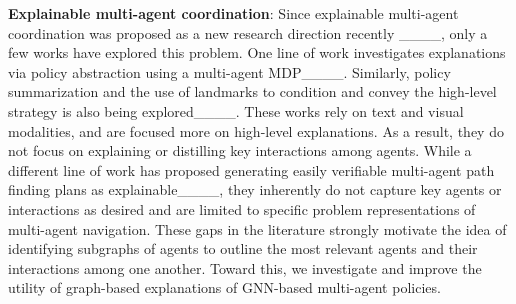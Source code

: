 

\textbf{Explainable multi-agent coordination}:
Since explainable multi-agent coordination was proposed as a new research direction recently ____, only a few works have explored this problem. 
One line of work investigates explanations via policy abstraction using a multi-agent MDP____. Similarly, policy summarization and the use of landmarks to condition and convey the high-level strategy is also being explored____. These works rely on text and visual modalities, and are focused more on high-level explanations. As a result, they do not focus on explaining or distilling key interactions among agents.
While a different line of work has proposed generating easily verifiable multi-agent path finding plans as explainable____, they inherently do not capture key agents or interactions as desired and are limited to specific problem representations of multi-agent navigation. These gaps in the literature strongly motivate the idea of identifying subgraphs of agents to outline the most relevant agents and their interactions among one another. Toward this, we investigate and improve the utility of graph-based explanations of GNN-based multi-agent policies.

